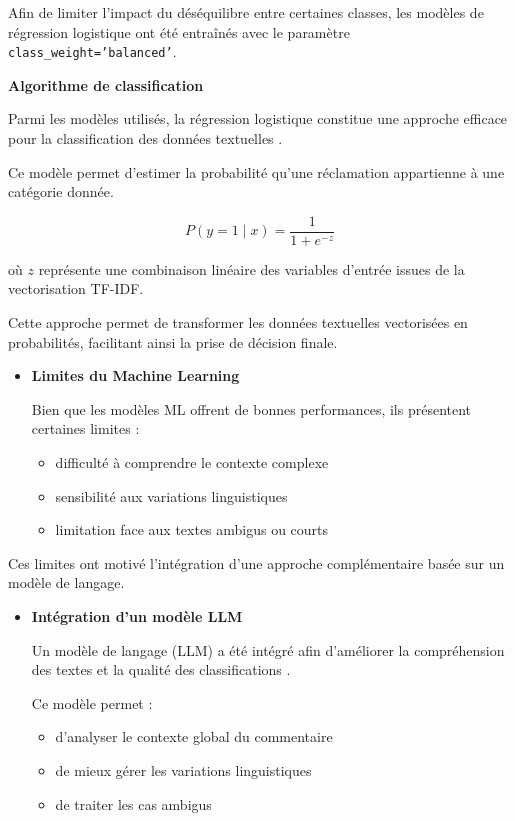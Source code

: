 \documentclass[12pt,a4paper,oneside]{report}
\begin{document}
\begin{itemize}
Afin de limiter l’impact du déséquilibre entre certaines classes, les modèles de régression logistique ont été entraînés avec le paramètre \texttt{class\_weight='balanced'}.


\textbf{Algorithme de classification}

Parmi les modèles utilisés, la régression logistique constitue une approche efficace pour la classification des données textuelles \cite{logreg}.

Ce modèle permet d’estimer la probabilité qu’une réclamation appartienne à une catégorie donnée.

\begin{equation}
P(y=1 \mid x) = \frac{1}{1 + e^{-z}}
\end{equation}

où $z$ représente une combinaison linéaire des variables d’entrée issues de la vectorisation TF-IDF.
\end{itemize}

Cette approche permet de transformer les données textuelles vectorisées en probabilités, facilitant ainsi la prise de décision finale.

\begin{itemize}
    \item \textbf{Limites du Machine Learning}

Bien que les modèles ML offrent de bonnes performances, ils présentent certaines limites :

\begin{itemize}
    \item difficulté à comprendre le contexte complexe
    \item sensibilité aux variations linguistiques
    \item limitation face aux textes ambigus ou courts
\end{itemize}
\end{itemize}

Ces limites ont motivé l’intégration d’une approche complémentaire basée sur un modèle de langage.

\begin{itemize}
    \item \textbf{Intégration d’un modèle LLM}

Un modèle de langage (LLM) a été intégré afin d’améliorer la compréhension des textes et la qualité des classifications \cite{ibmllm,hftransformers}.

Ce modèle permet :

\begin{itemize}
    \item d’analyser le contexte global du commentaire
    \item de mieux gérer les variations linguistiques
    \item de traiter les cas ambigus
\end{itemize}
\end{itemize}
\end{document}
